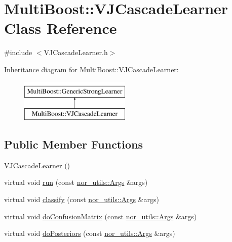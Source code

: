 \hypertarget{classMultiBoost_1_1VJCascadeLearner}{\section{Multi\-Boost\-:\-:V\-J\-Cascade\-Learner Class Reference}
\label{classMultiBoost_1_1VJCascadeLearner}
}


{\ttfamily \#include $<$V\-J\-Cascade\-Learner.\-h$>$}

Inheritance diagram for Multi\-Boost\-:\-:V\-J\-Cascade\-Learner\-:\begin{figure}[H]
\begin{center}
\leavevmode
\includegraphics[height=2.000000cm]{classMultiBoost_1_1VJCascadeLearner}
\end{center}
\end{figure}
\subsection*{Public Member Functions}
\begin{DoxyCompactItemize}
\item 
\hyperlink{classMultiBoost_1_1VJCascadeLearner_a1f88e07c0a6a9d8af97a23cdb7126905}{V\-J\-Cascade\-Learner} ()
\item 
virtual void \hyperlink{classMultiBoost_1_1VJCascadeLearner_a5999a683e72fbc2b088f4fee4ce57b49}{run} (const \hyperlink{classnor__utils_1_1Args}{nor\-\_\-utils\-::\-Args} \&args)
\item 
virtual void \hyperlink{classMultiBoost_1_1VJCascadeLearner_a16587bc47a62a429d10df5ab4526c69c}{classify} (const \hyperlink{classnor__utils_1_1Args}{nor\-\_\-utils\-::\-Args} \&args)
\item 
virtual void \hyperlink{classMultiBoost_1_1VJCascadeLearner_a607bd8e03f524db52b85ff9f7adca401}{do\-Confusion\-Matrix} (const \hyperlink{classnor__utils_1_1Args}{nor\-\_\-utils\-::\-Args} \&args)
\item 
virtual void \hyperlink{classMultiBoost_1_1VJCascadeLearner_ab1108cc910fa9ed25ac6c2bbac458fce}{do\-Posteriors} (const \hyperlink{classnor__utils_1_1Args}{nor\-\_\-utils\-::\-Args} \&args)
\end{DoxyCompactItemize}
